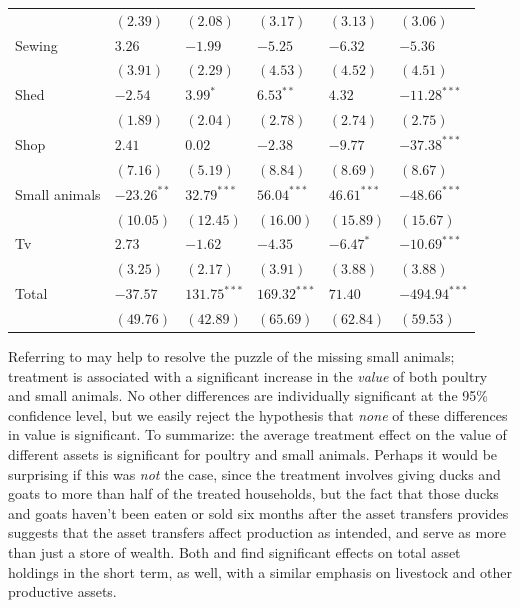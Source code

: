 \documentclass[11pt]{article}
\begin{document}
\begin{table}[htb]
\begin{tabular}{llllll}
 & $(2.39)$ & $(2.08)$ & $(3.17)$ & $(3.13)$ & $(3.06)$\\
Sewing & $3.26$ & $-1.99$ & $-5.25$ & $-6.32$ & $-5.36$\\
 & $(3.91)$ & $(2.29)$ & $(4.53)$ & $(4.52)$ & $(4.51)$\\
Shed & $-2.54$ & $3.99^{*}$ & $6.53^{**}$ & $4.32$ & $-11.28^{***}$\\
 & $(1.89)$ & $(2.04)$ & $(2.78)$ & $(2.74)$ & $(2.75)$\\
Shop & $2.41$ & $0.02$ & $-2.38$ & $-9.77$ & $-37.38^{***}$\\
 & $(7.16)$ & $(5.19)$ & $(8.84)$ & $(8.69)$ & $(8.67)$\\
Small animals & $-23.26^{**}$ & $32.79^{***}$ & $56.04^{***}$ & $46.61^{***}$ & $-48.66^{***}$\\
 & $(10.05)$ & $(12.45)$ & $(16.00)$ & $(15.89)$ & $(15.67)$\\
Tv & $2.73$ & $-1.62$ & $-4.35$ & $-6.47^{*}$ & $-10.69^{***}$\\
 & $(3.25)$ & $(2.17)$ & $(3.91)$ & $(3.88)$ & $(3.88)$\\
\hline
Total & $-37.57$ & $131.75^{***}$ & $169.32^{***}$ & $71.40$ & $-494.94^{***}$\\
 & $(49.76)$ & $(42.89)$ & $(65.69)$ & $(62.84)$ & $(59.53)$\\
\end{tabular}
\end{table}


Referring to  may help to resolve the puzzle
of the missing small animals; treatment is associated with a
significant increase in the \emph{value} of both poultry and small animals.
No other differences are individually significant at the 95\%
confidence level, but we easily reject the hypothesis that \emph{none} of
these differences in value is significant.  To summarize: the average
treatment effect on the value of different assets is significant for
poultry and small animals.  Perhaps it would be surprising if this was
\emph{not} the case, since the treatment involves giving ducks and goats to
more than half of the treated households, but the fact that those
ducks and goats haven't been eaten or sold six months after the asset
transfers provides suggests that the asset transfers
affect production as intended, and serve as more than just a store of wealth. Both
\cite{banerjee2015} and \cite{bandiera2017} find significant effects on total
asset holdings in the short term, as well, with a similar emphasis on livestock and
other productive assets. 
\end{document}
